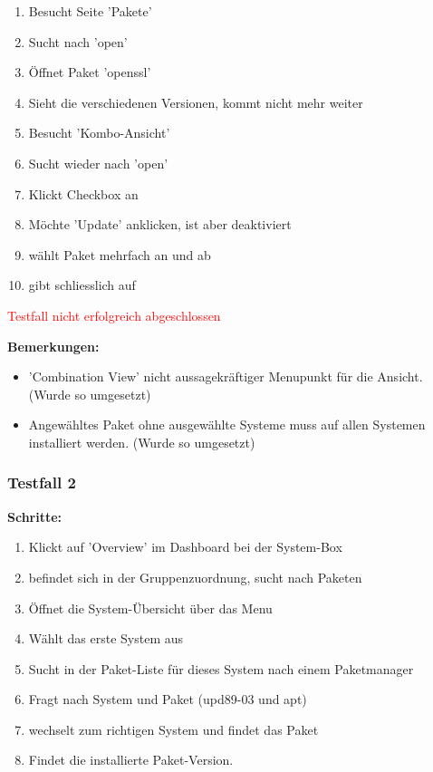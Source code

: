 {\begin{enumerate}
    \item Besucht Seite 'Pakete'
    \item Sucht nach 'open'
    \item Öffnet Paket 'openssl'
    \item Sieht die verschiedenen Versionen, kommt nicht mehr weiter
    \item Besucht 'Kombo-Ansicht'
    \item Sucht wieder nach 'open'
    \item Klickt Checkbox an
    \item Möchte 'Update' anklicken, ist aber deaktiviert
    \item wählt Paket mehrfach an und ab
    \item gibt schliesslich auf
\end{enumerate}

\textcolor{Red}{Testfall nicht erfolgreich abgeschlossen}

\bigskip
\textbf{Bemerkungen:}

\begin{itemize}[noitemsep,nolistsep]
    \item 'Combination View' nicht aussagekräftiger Menupunkt für die Ansicht. (Wurde so umgesetzt)
    \item Angewähltes Paket ohne ausgewählte Systeme muss auf allen Systemen installiert werden. (Wurde so umgesetzt)
\end{itemize}


\subsubsection*{Testfall 2}

\textbf{Schritte:}

\begin{enumerate}
    \item Klickt auf 'Overview' im Dashboard bei der System-Box
    \item befindet sich in der Gruppenzuordnung, sucht nach Paketen
    \item Öffnet die System-Übersicht über das Menu
    \item Wählt das erste System aus
    \item Sucht in der Paket-Liste für dieses System nach einem Paketmanager
    \item Fragt nach System und Paket (upd89-03 und apt)
    \item wechselt zum richtigen System und findet das Paket
    \item Findet die installierte Paket-Version.
\end{enumerate}

}
